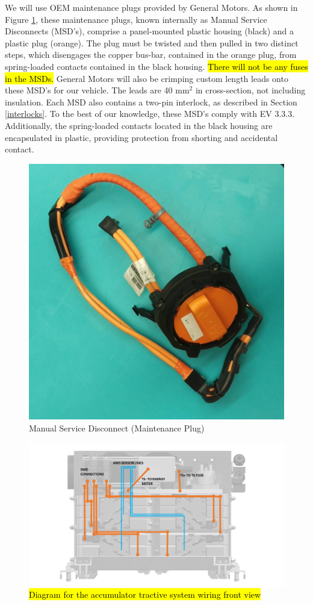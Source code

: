 \documentclass{article}
\DeclareRobustCommand{\hlr}[1]{{\sethlcolor{red}\hl{#1}}}
\begin{document}

            We will use OEM maintenance plugs provided by General Motors. As shown in Figure \ref{msd03}, these maintenance plugs, known internally as Manual Service Disconnects (MSD's), comprise a panel-mounted plastic housing (black) and a plastic plug (orange). The plug must be twisted and then pulled in two distinct steps, which disengages the copper bus-bar, contained in the orange plug, from spring-loaded contacts contained in the black housing. \hlr{There will not be any fuses in the MSDs.} General Motors will also be crimping custom length leads onto these MSD's for our vehicle. The leads are 40 mm$^2$ in cross-section, not including insulation. Each MSD also contains a two-pin interlock, as described in Section \ref{interlocks}. To the best of our knowledge, these MSD's comply with EV 3.3.3. Additionally, the spring-loaded contacts located in the black housing are encapsulated in plastic, providing protection from shorting and accidental contact.

            \begin{figure}[H]
                \centering
                \includegraphics[width = 0.5 \textwidth]{msd_highres}
                \caption{Manual Service Disconnect (Maintenance Plug)}
                \label{msd03}
            \end{figure}

            \begin{figure}[H]
                \centering
                \includegraphics[width = 0.5 \textwidth]{TRACTIVE_DIAGRAM_2}
                \caption{\hlr{Diagram for the accumulator tractive system wiring front view}}
                \label{tswiring_front}
            \end{figure}
\end{document}
